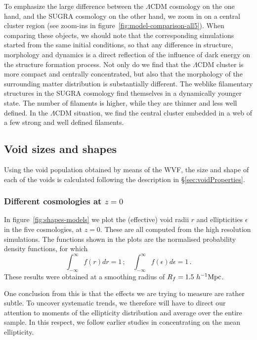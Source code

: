 To emphasize the large difference between the $\Lambda$CDM cosmology on the one hand, and the SUGRA cosmology on the 
other hand, we zoom in on a central cluster region (see zoom-ins in figure~\ref{fig:model-comparison-all5}). When 
comparing these objects, we should note that the corresponding simulations started from the same initial conditions, 
so that any difference in structure, morphology and dynamics is a direct reflection of the influence of dark energy 
on the structure formation process. Not only do we find that the $\Lambda$CDM cluster is more compact and centrally 
concentrated, but also that the morphology of the surrounding matter distribution is substantially different. The 
weblike filamentary structures in the SUGRA cosmology find themselves in a dynamically younger state. The number 
of filaments is higher, while they are thinner and less well defined. In the $\Lambda$CDM situation, we find the 
central cluster embedded in a web of a few strong and well defined filaments. 

\subsection{Void sizes and shapes}
\label{sec:morph-vol}
Using the void population obtained by means of the WVF, the size and shape of each of the voids is calculated 
following the description in \S\ref{sec:voidProperties}. 

\subsubsection{Different cosmologies at $z=0$}
In figure~\ref{fig:shapes-models} we plot the (effective) void radii 
$r$ and ellipticities $\epsilon$ in the five cosmologies, at $z=0$. These 
are all computed from the high resolution simulations. The functions shown in the plots are the normalised 
probability density functions, for which
\begin{equation}
\int_{-\infty}^{\infty} f(r)dr=1\,; \quad \int_{-\infty}^{\infty} f(\epsilon) d\epsilon =1\,.
\end{equation}
These results were obtained at a smoothing radius of $R_f=1.5~h^{-1} {\rm Mpc}$.

One conclusion from this is that the effects we are trying to measure are rather subtle. To 
uncover systematic trends, we therefore will have to direct our attention to moments of the 
ellipticity distribution and average over the entire sample. In this respect, we follow earlier 
studies in concentrating on the mean ellipticity.

